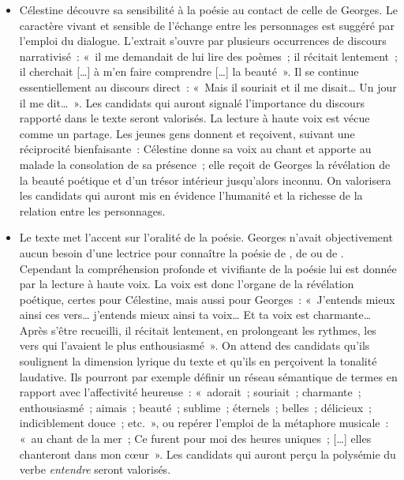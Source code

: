 {\begin{itemize}[label=\textbullet]
\item Célestine découvre sa sensibilité à la poésie au contact de celle de Georges. Le
caractère vivant et sensible de l'échange entre les personnages est suggéré par
l'emploi du dialogue. L'extrait s'ouvre par plusieurs occurrences de discours
narrativisé~: «~il me demandait de lui lire des poèmes~; il récitait lentement~; il cherchait
[…] à m'en faire comprendre […] la beauté~». Il se continue essentiellement au
discours direct~: «~Mais il souriait et il me disait… Un jour il me dit…~». Les candidats
qui auront signalé l'importance du discours rapporté dans le texte seront valorisés.
La lecture à haute voix est vécue comme un partage. Les jeunes gens donnent et
reçoivent, suivant une réciprocité bienfaisante~: Célestine donne sa voix au chant et
apporte au malade la consolation de sa présence~; elle reçoit de Georges la révélation
de la beauté poétique et d'un trésor intérieur jusqu'alors inconnu. On valorisera les
candidats qui auront mis en évidence l'humanité et la richesse de la relation entre les
personnages.
\item Le texte met l'accent sur l'oralité de la poésie. Georges n'avait objectivement aucun
besoin d'une lectrice pour connaître la poésie de , de  ou de .
Cependant la compréhension profonde et vivifiante de la poésie lui est donnée par la
lecture à haute voix. La voix est donc l'organe de la révélation poétique, certes pour
Célestine, mais aussi pour Georges~: «~J'entends mieux ainsi ces vers… j'entends
mieux ainsi ta voix… Et ta voix est charmante… Après s'être recueilli, il récitait
lentement, en prolongeant les rythmes, les vers qui l'avaient le plus enthousiasmé~».
On attend des candidats qu'ils soulignent la dimension lyrique du texte et qu'ils en
perçoivent la tonalité laudative. Ils pourront par exemple définir un réseau sémantique
de termes en rapport avec l'affectivité heureuse~: «~adorait~; souriait~; charmante~;
enthousiasmé~; aimais~; beauté~; sublime~; éternels~; belles~; délicieux~; indiciblement
douce~; etc.~», ou repérer l'emploi de la métaphore musicale~: «~au chant de la mer~;
Ce furent pour moi des heures uniques~; […] elles chanteront dans mon cœur~». Les
candidats qui auront perçu la polysémie du verbe \textit{entendre} seront valorisés.


\end{itemize}}
